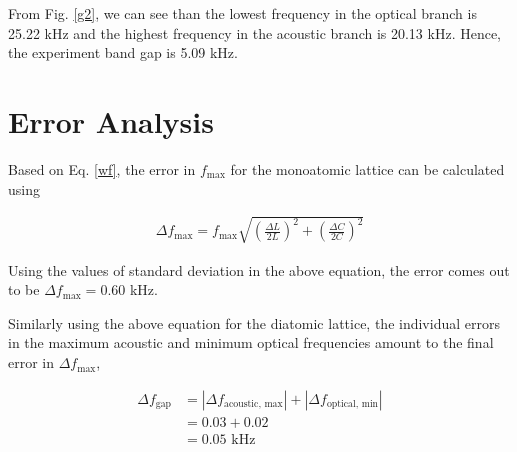 From Fig. \ref{g2}, we can see than the lowest frequency in the optical branch is 25.22 kHz and the highest frequency in the acoustic branch is 20.13 kHz. Hence, the experiment band gap is 5.09 kHz.

\section{Error Analysis}

Based on Eq. \ref{wf}, the error in $f_\text{max}$ for the monoatomic lattice can be calculated using

\begin{align}
    \Delta f_\text{max} = f_\text{max}\sqrt{\left(\frac{\Delta L}{2L}\right)^2 + \left(\frac{\Delta C}{2C}\right)^2}
\end{align}

Using the values of standard deviation in the above equation, the error comes out to be $\Delta f_\text{max} = 0.60$ kHz.

Similarly using the above equation for the diatomic lattice, the individual errors in the maximum acoustic and minimum optical frequencies amount to the final error in $\Delta f_\text{max}$,

\begin{align*}
    \Delta f_\text{gap} &= |\Delta f_\text{acoustic, max}| + |\Delta f_\text{optical, min}|\\
    &= 0.03 + 0.02 \\
    &= 0.05 \text{ kHz}
\end{align*}